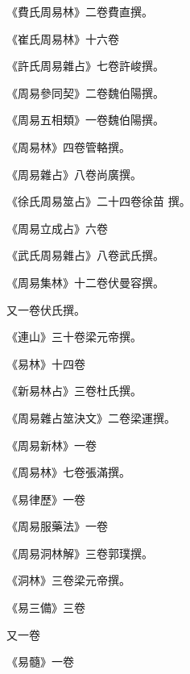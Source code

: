 \begin{pinyinscope}
 《費氏周易林》二卷費直撰。



 《崔氏周易林》十六卷



 《許氏周易雜占》七卷許峻撰。



 《周易參同契》二卷魏伯陽撰。



 《周易五相類》一卷魏伯陽撰。



 《周易林》四卷管輅撰。



 《周易雜占》八卷尚廣撰。



 《徐氏周易筮占》二十四卷徐苗
 撰。



 《周易立成占》六卷



 《武氏周易雜占》八卷武氏撰。



 《周易集林》十二卷伏曼容撰。



 又一卷伏氏撰。



 《連山》三十卷梁元帝撰。



 《易林》十四卷



 《新易林占》三卷杜氏撰。



 《周易雜占筮決文》二卷梁運撰。



 《周易新林》一卷



 《周易林》七卷張滿撰。



 《易律歷》一卷



 《周易服藥法》一卷



 《周易洞林解》三卷郭璞撰。



 《洞林》三卷梁元帝撰。



 《易三備》三卷



 又一卷



 《易髓》一卷




\end{pinyinscope}
